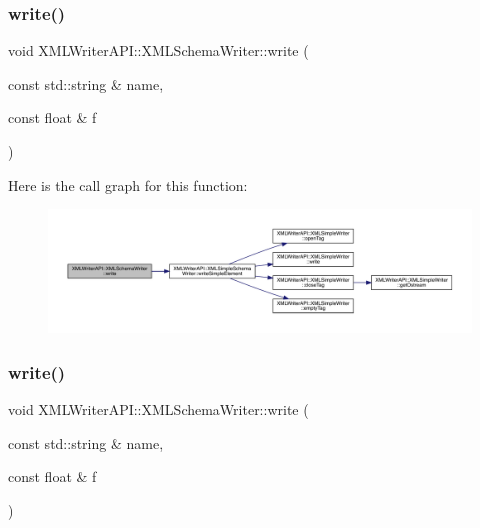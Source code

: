 \subsubsection{\texorpdfstring{write()}{write()}\hspace{0.1cm}{\footnotesize\ttfamily [8/15]}}
{\footnotesize\ttfamily void X\+M\+L\+Writer\+A\+P\+I\+::\+X\+M\+L\+Schema\+Writer\+::write (\begin{DoxyParamCaption}\item[{const std\+::string \&}]{name,  }\item[{const float \&}]{f }\end{DoxyParamCaption})\hspace{0.3cm}{\ttfamily [inline]}}

Here is the call graph for this function\+:
\nopagebreak
\begin{figure}[H]
\begin{center}
\leavevmode
\includegraphics[width=350pt]{db/d34/classXMLWriterAPI_1_1XMLSchemaWriter_affbcfbac63240a8048b6b0940cc05c30_cgraph}
\end{center}
\end{figure}
\mbox{\label{classXMLWriterAPI_1_1XMLSchemaWriter_affbcfbac63240a8048b6b0940cc05c30}} 
\subsubsection{\texorpdfstring{write()}{write()}\hspace{0.1cm}{\footnotesize\ttfamily [9/15]}}
{\footnotesize\ttfamily void X\+M\+L\+Writer\+A\+P\+I\+::\+X\+M\+L\+Schema\+Writer\+::write (\begin{DoxyParamCaption}\item[{const std\+::string \&}]{name,  }\item[{const float \&}]{f }\end{DoxyParamCaption})\hspace{0.3cm}{\ttfamily [inline]}}

